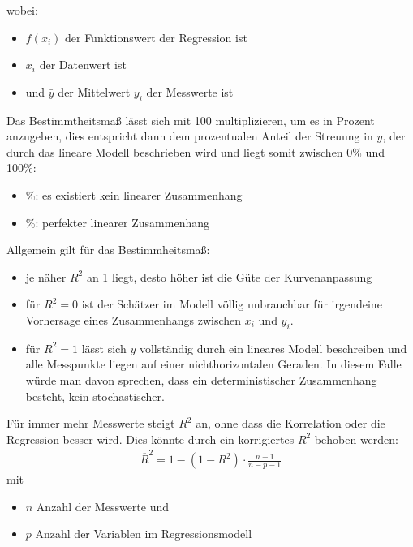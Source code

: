 \documentclass[letterpaper,10pt,english]{jupyterBook}
\begin{document}
\sphinxAtStartPar
wobei:
\begin{itemize}
\item {} 
\sphinxAtStartPar
\(f(x_i)\) der Funktionswert der Regression ist

\item {} 
\sphinxAtStartPar
\(x_i\) der Datenwert ist

\item {} 
\sphinxAtStartPar
und \(\bar y\) der Mittelwert \(y_i\) der Messwerte ist

\end{itemize}

\sphinxAtStartPar
Das Bestimmtheitsmaß lässt sich mit 100 multiplizieren, um es in Prozent anzugeben, dies entspricht dann dem prozentualen Anteil der Streuung in \(y\), der durch das lineare Modell beschrieben wird und liegt somit zwischen 0\% und 100\%:
\begin{itemize}
\item {} 
\%: es existiert kein linearer Zusammenhang

\item {} 
\%: perfekter linearer Zusammenhang

\end{itemize}

\sphinxAtStartPar
Allgemein gilt für das Bestimmheitsmaß:
\begin{itemize}
\item {} 
\sphinxAtStartPar
je näher \(\mathit{R}^2\) an 1 liegt, desto höher ist die Güte der Kurvenanpassung

\item {} 
\sphinxAtStartPar
für \(\mathit{R}^2=0\) ist der Schätzer im Modell völlig unbrauchbar für irgendeine Vorhersage eines Zusammenhangs zwischen \(x_i\) und \(y_i\).

\item {} 
\sphinxAtStartPar
für \(\mathit{R}^2=1\) lässt sich \(y\) vollständig durch ein lineares Modell beschreiben und alle Messpunkte liegen auf einer nicht\sphinxhyphen{}horizontalen Geraden. In diesem Falle würde man davon sprechen, dass ein deterministischer Zusammenhang besteht, kein stochastischer.

\end{itemize}

\sphinxAtStartPar
{}
Für immer mehr Messwerte steigt \(\mathit{R}^2\) an, ohne dass die Korrelation oder die Regression besser wird.
Dies könnte durch ein korrigiertes \(\mathit{R}^2\) behoben werden:
\begin{equation*}
\begin{split}\mathit{\overline R}^2 = 1-(1-\mathit{R}^2)\cdot \frac{n-1}{n-p-1}\end{split}
\end{equation*}
\sphinxAtStartPar
mit
\begin{itemize}
\item {} 
\sphinxAtStartPar
\(n\) Anzahl der Messwerte und

\item {} 
\sphinxAtStartPar
\(p\) Anzahl der Variablen im Regressionsmodell

\end{itemize}
\end{document}
